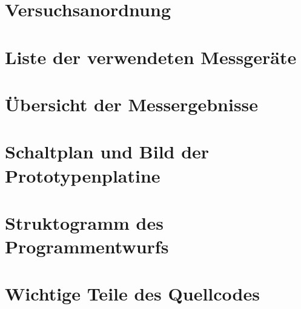 \setcounter{chapter}{3}
\setcounter{section}{0}
\setcounter{table}{0}
\setcounter{figure}{0}

\section{Versuchsanordnung}

\section{Liste der verwendeten Messgeräte}

\section{Übersicht der Messergebnisse}

\section{Schaltplan und Bild der Prototypenplatine}

\setcounter{chapter}{4}
\setcounter{section}{0}
\setcounter{table}{0}
\setcounter{figure}{0}

\section{Struktogramm des Programmentwurfs}

\section{Wichtige Teile des Quellcodes}

	\setcounter{chapter}{5}
	\setcounter{section}{0}
	\setcounter{table}{0}
	\setcounter{figure}{0}

\begin{comment}	
	Auf den folgenden Seiten wird eine Möglichkeit gezeigt, wie aus einem anderen PDF-Dokument komplette Seiten übernommen werden können, z.~B. zum Einbindungen von Datenblättern. Der Nachteil dieser Methode besteht darin, dass sämtliche Formateinstellungen (Kopfzeilen, Seitenzahlen, Ränder, etc.) auf diesen Seiten nicht angezeigt werden. Die Methode wird deshalb eher selten gewählt. Immerhin sorgt das Package \textit{\glqq pdfpages\grqq}~für eine korrekte Seitenzahleinstellung auf den im Anschluss folgenden \glqq nativen\grqq~\LaTeX-Seiten.
	
	Eine bessere Alternative ist, einzelne Seiten mit \textit{\glqq$\backslash$includegraphics\grqq}~einzubinden.
	
	
\end{comment}

